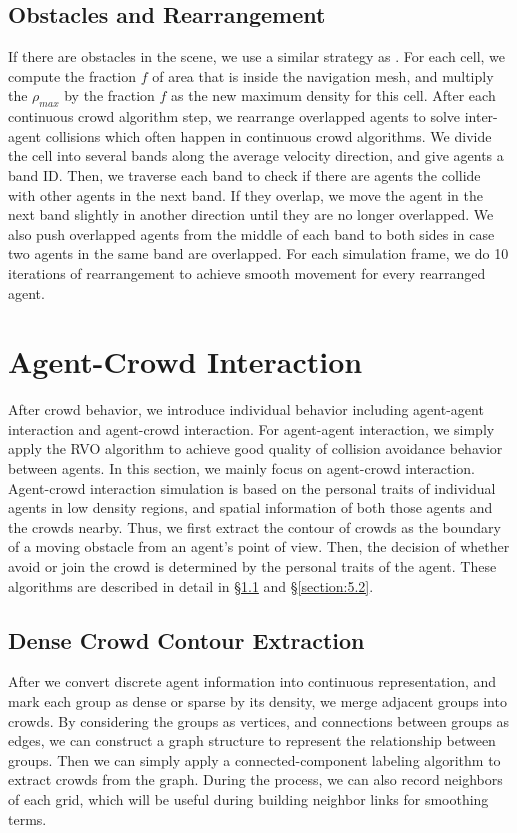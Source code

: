 \documentclass[conference]{acmsiggraph}
\begin{document}
\subsection{Obstacles and Rearrangement}
\label{section:4.3}
If there are obstacles in the scene, we use a similar strategy as \cite{Narain:2009}. For each cell, we compute the fraction $f$ of area that is inside the navigation mesh, and multiply the $\rho_{max}$ by the fraction $f$ as the new maximum density for this cell. 
After each continuous crowd algorithm step, we rearrange overlapped agents to solve inter-agent collisions which often happen in continuous crowd algorithms. We divide the cell into several bands along the average velocity direction, and give agents a band ID. Then, we traverse each band to check if there are agents the collide with other agents in the next band. If they overlap, we move the agent in the next band slightly in another direction until they are no longer overlapped. We also push overlapped agents from the middle of each band to both sides in case two agents in the same band are overlapped. For each simulation frame, we do 10 iterations of rearrangement to achieve smooth movement for every rearranged agent.

\section{Agent-Crowd Interaction}
\label{section:5}
After crowd behavior, we introduce individual behavior including agent-agent interaction and agent-crowd interaction. For agent-agent interaction, we simply apply the RVO algorithm to achieve good quality of collision avoidance behavior between agents. In this section, we mainly focus on agent-crowd interaction. Agent-crowd interaction simulation is based on the personal traits of individual agents in low density regions, and spatial information of both those agents and the crowds nearby. Thus, we first extract the contour of crowds as the boundary of a moving obstacle from an agent’s point of view. Then, the decision of whether avoid or join the crowd is determined by the personal traits of the agent. These algorithms are described in detail in \S\ref{section:5.1} and \S\ref{section:5.2}.

\subsection{Dense Crowd Contour Extraction}
\label{section:5.1}
After we convert discrete agent information into continuous representation, and mark each group as dense or sparse by its density, we merge adjacent groups into crowds. By considering the groups as vertices, and connections between groups as edges, we can construct a graph structure to represent the relationship between groups. Then we can simply apply a connected-component labeling algorithm to extract crowds from the graph. During the process, we can also record neighbors of each grid, which will be useful during building neighbor links for smoothing terms.
\end{document}

